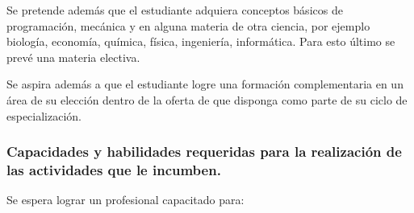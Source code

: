 \documentclass[a4paper, 12pt]{article}
\begin{document}
 Se pretende además que el estudiante adquiera conceptos básicos de programación, mecánica y en alguna materia de otra ciencia, por ejemplo biología, economía, química, física, ingeniería, informática. Para esto último se prevé una  materia electiva. 

 Se aspira además a que el estudiante logre una formación complementaria en un área de su elección dentro de la oferta de que disponga como parte de su ciclo de especialización.
 
\subsubsection{Capacidades y habilidades requeridas para la realización de las actividades que le incumben.}\label{subsec:competencias}


Se espera lograr un profesional capacitado para:
\end{document}
